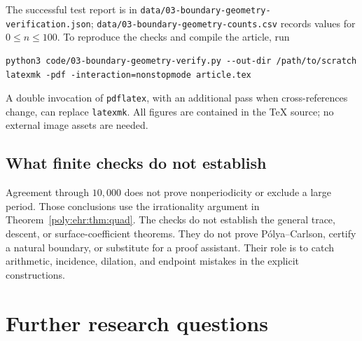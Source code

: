 \documentclass[11pt,a4paper]{article}
\numberwithin{equation}{section}
\theoremstyle{plain}
\newcommand{\wtag}{\textup{[write]}}%
\newcommand{\pathcode}[1]{\nolinkurl{#1}}
\begin{document}
The successful test report is in \pathcode{data/03-boundary-geometry-verification.json};
\pathcode{data/03-boundary-geometry-counts.csv} records values for $0\leq n\leq100$.
To reproduce the checks and compile the article, run
\begin{verbatim}
python3 code/03-boundary-geometry-verify.py --out-dir /path/to/scratch
latexmk -pdf -interaction=nonstopmode article.tex
\end{verbatim}
A double invocation of \texttt{pdflatex}, with an additional pass when
cross-references change, can replace \texttt{latexmk}. All figures are
contained in the TeX source; no external image assets are needed.

\noindent[\wtag{} Delivery names replaced. Manuscript~03 printed
\texttt{verify.py}, \texttt{verification.json}, \texttt{counts.csv} and
\texttt{python3 verify.py}; the shipped names are those above. Without
\texttt{--out-dir} the program writes \texttt{verification.json} and
\texttt{counts.csv} next to itself, that is, into \pathcode{code/}. The
report's recorded outputs are under \pathcode{data/} and should never be
overwritten, so pass an output directory outside the report. The program
writes the CSV with Python's \texttt{csv} module, so its lines end in CRLF
on every platform. The shipped
\pathcode{data/03-boundary-geometry-counts.csv} keeps those bytes: 102 lines
(a header and $n=0,\ldots,100$), each ending in CRLF, and marked
\texttt{-text} for Git. Manuscript~03's own TeX file
\texttt{surreal\_polytopes.tex} is not shipped: its text is this Part of the
report's \texttt{article.tex}, which the second command builds.]

\subsection{What finite checks do not establish}

Agreement through $10{,}000$ does not prove nonperiodicity or exclude a
large period. Those conclusions use the irrationality argument in
Theorem~\ref{poly:ehr:thm:quad}. The checks do not establish the general trace,
descent, or surface-coefficient theorems. They do not prove
P\'olya--Carlson, certify a natural boundary, or substitute for a proof
assistant. Their role is to catch arithmetic, incidence, dilation, and
endpoint mistakes in the explicit constructions.

\section{Further research questions}\label{poly:ehr:sec:questions}
\end{document}
